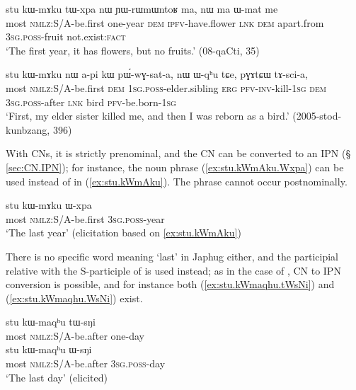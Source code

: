\begin{exe}
\ex  \label{ex:stu.kWmAku}
 \gll stu kɯ-mɤku tɯ-xpa nɯ ɲɯ-rɯmɯntoʁ ma, nɯ ma ɯ-mat me \\
most \textsc{nmlz}:S/A-be.first one-year \textsc{dem} \textsc{ipfv}-have.flower \textsc{lnk} \textsc{dem} apart.from \textsc{3sg}.\textsc{poss}-fruit not.exist:\textsc{fact} \\
\glt `The first year, it has flowers, but no fruits.' (08-qaCti, 35)
  \end{exe}
  
\begin{exe}
\ex  \label{ex:stu.kWmAku2}
 \gll stu kɯ-mɤku nɯ a-pi kɯ pɯ́-wɣ-sat-a,  nɯ ɯ-qʰu tɕe, pɣɤtɕɯ tɤ-sci-a, \\
most \textsc{nmlz}:S/A-be.first \textsc{dem} \textsc{1sg}.\textsc{poss}-elder.sibling \textsc{erg} \textsc{pfv}-\textsc{inv}-kill-\textsc{1sg} \textsc{dem} \textsc{3sg}.\textsc{poss}-after \textsc{lnk} bird \textsc{pfv}-be.born-\textsc{1sg} \\
\glt `First, my elder sister killed me, and then I was reborn as a bird.' (2005-stod-kunbzang, 396)
\end{exe}

With CNs, it is strictly prenominal, and the CN can be converted to an IPN (§ \ref{sec:CN.IPN}); for instance, the noun phrase (\ref{ex:stu.kWmAku.Wxpa}) can be used instead of  in (\ref{ex:stu.kWmAku}). The phrase  cannot occur postnominally.

\begin{exe}
\ex  \label{ex:stu.kWmAku.Wxpa}
 \gll  stu kɯ-mɤku ɯ-xpa \\
 most \textsc{nmlz}:S/A-be.first \textsc{3sg}.\textsc{poss}-year  \\
 \glt  `The last year' (elicitation based on \ref{ex:stu.kWmAku})
\end{exe}

There is no specific word meaning `last' in Japhug either, and the participial relative   with the S-participle of  is used instead; as in the case of , CN to IPN conversion is possible, and for instance both (\ref{ex:stu.kWmaqhu.tWsNi}) and (\ref{ex:stu.kWmaqhu.WsNi}) exist.

\begin{exe}
\ex \label{ex:stu.kWmaqhu.tWsNi}
 \gll  stu kɯ-maqʰu tɯ-sŋi  \\
 most \textsc{nmlz}:S/A-be.after one-day \\
 \ex \label{ex:stu.kWmaqhu.WsNi}
  \gll  stu kɯ-maqʰu ɯ-sŋi  \\
 most \textsc{nmlz}:S/A-be.after \textsc{3sg}.\textsc{poss}-day \\
\glt `The last day' (elicited)
\end{exe}

